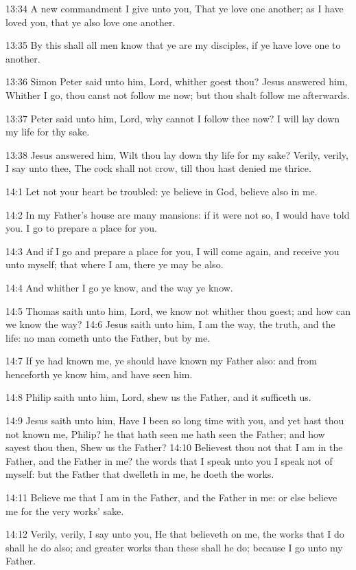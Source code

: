 13:34 A new commandment I give unto you, That ye love one another; as I have loved you, that ye also love one another.

13:35 By this shall all men know that ye are my disciples, if ye have love one to another.

13:36 Simon Peter said unto him, Lord, whither goest thou? Jesus answered him, Whither I go, thou canst not follow me now; but thou shalt follow me afterwards.

13:37 Peter said unto him, Lord, why cannot I follow thee now? I will lay down my life for thy sake.

13:38 Jesus answered him, Wilt thou lay down thy life for my sake?  Verily, verily, I say unto thee, The cock shall not crow, till thou hast denied me thrice.

14:1 Let not your heart be troubled: ye believe in God, believe also in me.

14:2 In my Father's house are many mansions: if it were not so, I would have told you. I go to prepare a place for you.

14:3 And if I go and prepare a place for you, I will come again, and receive you unto myself; that where I am, there ye may be also.

14:4 And whither I go ye know, and the way ye know.

14:5 Thomas saith unto him, Lord, we know not whither thou goest; and how can we know the way?  14:6 Jesus saith unto him, I am the way, the truth, and the life: no man cometh unto the Father, but by me.

14:7 If ye had known me, ye should have known my Father also: and from henceforth ye know him, and have seen him.

14:8 Philip saith unto him, Lord, shew us the Father, and it sufficeth us.

14:9 Jesus saith unto him, Have I been so long time with you, and yet hast thou not known me, Philip? he that hath seen me hath seen the Father; and how sayest thou then, Shew us the Father?  14:10 Believest thou not that I am in the Father, and the Father in me?  the words that I speak unto you I speak not of myself: but the Father that dwelleth in me, he doeth the works.

14:11 Believe me that I am in the Father, and the Father in me: or else believe me for the very works' sake.

14:12 Verily, verily, I say unto you, He that believeth on me, the works that I do shall he do also; and greater works than these shall he do; because I go unto my Father.

